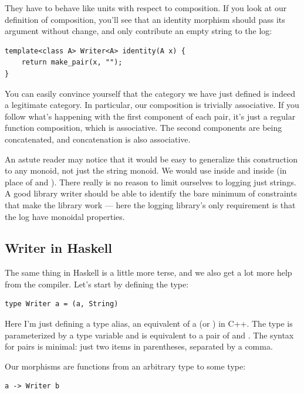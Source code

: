 They have to behave like units with respect to composition. If you look
at our definition of composition, you'll see that an identity morphism
should pass its argument without change, and only contribute an empty
string to the log:

\begin{verbatim}
template<class A> Writer<A> identity(A x) {
    return make_pair(x, "");
}
\end{verbatim}

You can easily convince yourself that the category we have just defined
is indeed a legitimate category. In particular, our composition is
trivially associative. If you follow what's happening with the first
component of each pair, it's just a regular function composition, which
is associative. The second components are being concatenated, and
concatenation is also associative.

An astute reader may notice that it would be easy to generalize this
construction to any monoid, not just the string monoid. We would use
 inside  and  inside
 (in place of \code{+} and ). There really
is no reason to limit ourselves to logging just strings. A good library
writer should be able to identify the bare minimum of constraints that
make the library work --- here the logging library's only requirement is
that the log have monoidal properties.

\subsection{Writer in Haskell}\label{writer-in-haskell}

The same thing in Haskell is a little more terse, and we also get a lot
more help from the compiler. Let's start by defining the 
type:

\begin{verbatim}
type Writer a = (a, String)
\end{verbatim}

Here I'm just defining a type alias, an equivalent of a 
(or ) in C++. The type  is parameterized by
a type variable  and is equivalent to a pair of  and
. The syntax for pairs is minimal: just two items in
parentheses, separated by a comma.

Our morphisms are functions from an arbitrary type to some
 type:

\begin{verbatim}
a -> Writer b
\end{verbatim}

